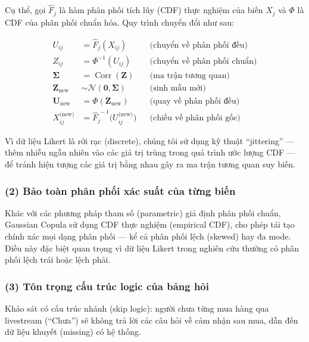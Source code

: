 \documentclass[12pt,a4paper]{article}
\newcommand{\N}{\mathcal{N}}
\newcommand{\CDF}{\hat{F}}
\newcommand{\CDFinv}{\hat{F}^{\,-1}}
\begin{document}
Cụ thể, gọi $\CDF_j$ là hàm phân phối tích lũy (CDF) thực nghiệm 
của biến $X_j$ và $\Phi$ là CDF của phân phối chuẩn hóa. 
Quy trình chuyển đổi như sau:

\begin{align}
    U_{ij} &= \CDF_j(X_{ij})                    && \text{(chuyển về phân phối đều)}   \label{eq:uniform} \\
    Z_{ij} &= \Phi^{-1}(U_{ij})                  && \text{(chuyển về phân phối chuẩn)} \label{eq:normal} \\
    \bm{\Sigma} &= \operatorname{Corr}(\bm{Z})   && \text{(ma trận tương quan)}         \label{eq:corr} \\
    \bm{Z}_{\text{new}} &\sim \N(\bm{0}, \bm{\Sigma}) && \text{(sinh mẫu mới)}          \label{eq:sampling} \\
    \bm{U}_{\text{new}} &= \Phi(\bm{Z}_{\text{new}})  && \text{(quay về phân phối đều)} \label{eq:back} \\
    X_{ij}^{\text{(new)}} &= \CDFinv_j\bigl(U_{ij}^{\text{(new)}}\bigr) && \text{(chiếu về phân phối gốc)} \label{eq:inverse}
\end{align}

Vì dữ liệu Likert là rời rạc (discrete), chúng tôi sử dụng kỹ thuật 
``jittering'' — thêm nhiễu ngẫu nhiên vào các giá trị trùng 
trong quá trình ước lượng CDF — để tránh hiện tượng 
các giá trị bằng nhau gây ra ma trận tương quan suy biến.

\subsubsection{(2) Bảo toàn phân phối xác suất của từng biến}

Khác với các phương pháp tham số (parametric) giả định phân phối chuẩn, 
Gaussian Copula sử dụng CDF thực nghiệm (empirical CDF), 
cho phép tái tạo chính xác mọi dạng phân phối — 
kể cả phân phối lệch (skewed) hay đa mode. 
Điều này đặc biệt quan trọng vì dữ liệu Likert trong nghiên cứu 
thường có phân phối lệch trái hoặc lệch phải.

\subsubsection{(3) Tôn trọng cấu trúc logic của bảng hỏi}

Khảo sát có cấu trúc nhánh (skip logic): 
người chưa từng mua hàng qua livestream (``Chưa'') 
sẽ không trả lời các câu hỏi về cảm nhận sau mua, 
dẫn đến dữ liệu khuyết (missing) có hệ thống.
\end{document}
